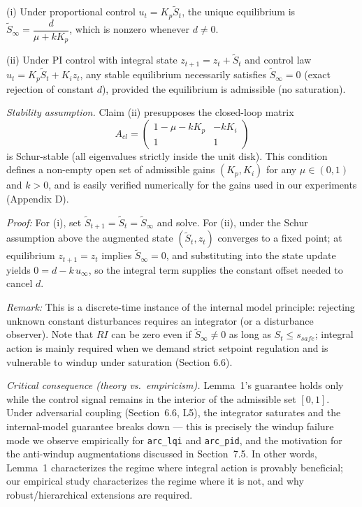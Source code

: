\documentclass{article}
\begin{document}
(i) Under proportional control $u_t = K_p\tilde{S}_t$, the unique equilibrium is $\tilde{S}_\infty = \dfrac{d}{\mu + kK_p}$, which is nonzero whenever $d\neq 0$.

(ii) Under PI control with integral state $z_{t+1}=z_t + \tilde{S}_t$ and control law $u_t = K_p\tilde{S}_t + K_i z_t$, any stable equilibrium necessarily satisfies $\tilde{S}_\infty = 0$ (exact rejection of constant $d$), provided the equilibrium is admissible (no saturation).

\textit{Stability assumption.} Claim (ii) presupposes the closed-loop matrix
\[
A_{cl} = \begin{pmatrix} 1-\mu-kK_p & -kK_i \\ 1 & 1 \end{pmatrix}
\]
is Schur-stable (all eigenvalues strictly inside the unit disk). This condition defines a non-empty open set of admissible gains $(K_p, K_i)$ for any $\mu\in(0,1)$ and $k>0$, and is easily verified numerically for the gains used in our experiments (Appendix D).

\textit{Proof:} For (i), set $\tilde{S}_{t+1}=\tilde{S}_t=\tilde{S}_\infty$ and solve. For (ii), under the Schur assumption above the augmented state $(\tilde{S}_t, z_t)$ converges to a fixed point; at equilibrium $z_{t+1}=z_t$ implies $\tilde{S}_\infty=0$, and substituting into the state update yields $0=d-k\,u_\infty$, so the integral term supplies the constant offset needed to cancel $d$.

\textit{Remark:} This is a discrete-time instance of the internal model principle: rejecting unknown constant disturbances requires an integrator (or a disturbance observer). Note that $RI$ can be zero even if $\tilde{S}_\infty\neq 0$ as long as $S_t \le s_{safe}$; integral action is mainly required when we demand strict setpoint regulation and is vulnerable to windup under saturation (Section 6.6).

\textit{Critical consequence (theory vs.\ empiricism).} Lemma~1's guarantee holds only while the control signal remains in the interior of the admissible set $[0,1]$. Under adversarial coupling (Section~6.6, L5), the integrator saturates and the internal-model guarantee breaks down --- this is precisely the windup failure mode we observe empirically for \texttt{arc\_lqi} and \texttt{arc\_pid}, and the motivation for the anti-windup augmentations discussed in Section~7.5. In other words, Lemma~1 characterizes the regime where integral action is provably beneficial; our empirical study characterizes the regime where it is not, and why robust/hierarchical extensions are required.
\end{document}
